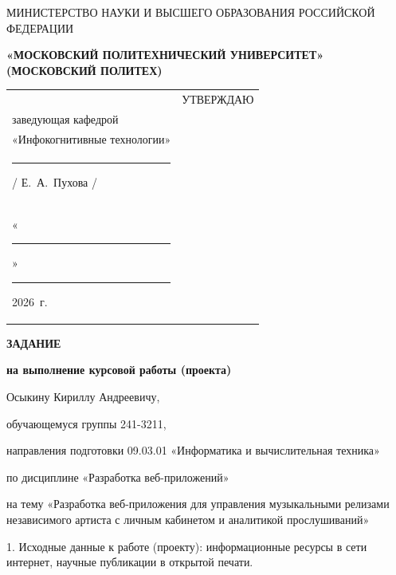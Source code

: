 \documentclass[14pt, a4paper]{extarticle}
\begin{document}
\pagestyle{empty}


\begin{center}
    {\small МИНИСТЕРСТВО НАУКИ И ВЫСШЕГО ОБРАЗОВАНИЯ РОССИЙСКОЙ ФЕДЕРАЦИИ}


    {\small \textbf{«МОСКОВСКИЙ ПОЛИТЕХНИЧЕСКИЙ УНИВЕРСИТЕТ»}} \\
    {\small \textbf{(МОСКОВСКИЙ ПОЛИТЕХ)}}
\end{center}

\begin{tabularx}{\textwidth}{@{} p{} p{} @{}}
     &
    \raggedright
    УТВЕРЖДАЮ                          \\
    заведующая кафедрой                \\
    «Инфокогнитивные технологии»       \\[0.3cm]

    \rule{3cm}{0.4pt} / Е.~А.~Пухова / \\[0.1cm]

    «\rule{0.8cm}{0.4pt}» \rule{3cm}{0.4pt} 2026~г.
\end{tabularx}


\begin{center}

    {\large \textbf{ЗАДАНИЕ}}

    \textbf{на выполнение курсовой работы (проекта)}

    Осыкину Кириллу Андреевичу,

\end{center}

обучающемуся группы 241-3211,

направления подготовки 09.03.01 «Информатика и вычислительная техника»

по дисциплине «Разработка веб-приложений»

на тему «Разработка веб-приложения для управления музыкальными релизами независимого артиста с личным кабинетом и аналитикой прослушиваний»

1. Исходные данные к работе (проекту): информационные ресурсы в сети
интернет, научные публикации в открытой печати.
\end{document}
